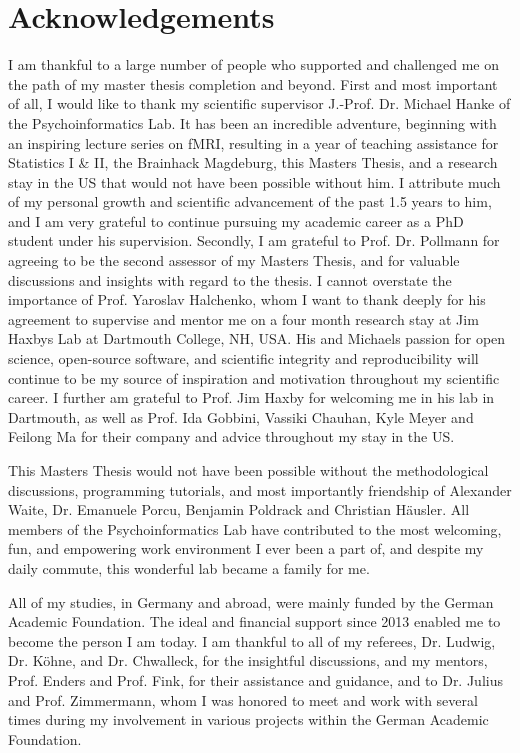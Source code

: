 \documentclass[a4paper, 11pt]{scrreprt}
\begin{document}
\chapter*{Acknowledgements}

I am thankful to a large number of people who supported and challenged me on the path of my master thesis completion and beyond. First and most important of all, I would like to thank my scientific supervisor J.-Prof. Dr. Michael Hanke of the Psychoinformatics Lab. It has been an incredible adventure, beginning with an inspiring lecture series on fMRI, resulting in a year of teaching assistance for Statistics I \& II, the Brainhack Magdeburg, this Masters Thesis, and a research stay in the US that would not have been possible without him. I attribute much of my personal growth and scientific advancement of the past 1.5 years to him, and I am very grateful to continue pursuing my academic career as a PhD student under his supervision.
Secondly, I am grateful to Prof. Dr. Pollmann for agreeing to be the second assessor of my Masters Thesis, and for valuable discussions and insights with regard to the thesis.
I cannot overstate the importance of Prof. Yaroslav Halchenko, whom I want to thank deeply for his agreement to supervise and mentor me on a four month research stay at Jim Haxbys Lab at Dartmouth College, NH, USA. His and Michaels passion for open science, open-source software, and scientific integrity and reproducibility will continue to be my source of inspiration and motivation throughout my scientific career.
I further am grateful to Prof. Jim Haxby for welcoming me in his lab in Dartmouth, as well as Prof. Ida Gobbini, Vassiki Chauhan, Kyle Meyer and Feilong Ma for their company and advice throughout my stay in the US.
 
\bigskip

This Masters Thesis would not have been possible without the methodological discussions, programming tutorials, and most importantly friendship of Alexander Waite, Dr. Emanuele Porcu, Benjamin Poldrack and Christian Häusler. All members of the Psychoinformatics Lab have contributed to the most welcoming, fun, and empowering work environment I ever been a part of, and despite my daily commute, this wonderful lab became a family for me.

\bigskip

All of my studies, in Germany and abroad, were mainly funded by the German Academic Foundation. The ideal and financial support since 2013 enabled me to become the person I am today. I am thankful to all of my referees, Dr. Ludwig, Dr. Köhne, and Dr. Chwalleck, for the insightful discussions, and my mentors, Prof. Enders and Prof. Fink, for their assistance and guidance, and to Dr. Julius and Prof. Zimmermann, whom I was honored to meet and work with several times during my involvement in various projects within the German Academic Foundation. 
\end{document}
